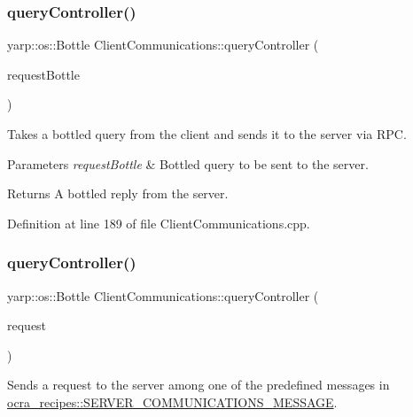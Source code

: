 \subsubsection{\texorpdfstring{query\+Controller()}{queryController()}\hspace{0.1cm}{\footnotesize\ttfamily [1/3]}}
{\footnotesize\ttfamily yarp\+::os\+::\+Bottle Client\+Communications\+::query\+Controller (\begin{DoxyParamCaption}\item[{yarp\+::os\+::\+Bottle \&}]{request\+Bottle }\end{DoxyParamCaption})}

Takes a bottled query from the client and sends it to the server via R\+PC.


\begin{DoxyParams}{Parameters}
{\em request\+Bottle} & Bottled query to be sent to the server.\\
\hline
\end{DoxyParams}
\begin{DoxyReturn}{Returns}
A bottled reply from the server. 
\end{DoxyReturn}


Definition at line 189 of file Client\+Communications.\+cpp.

\hypertarget{classocra__recipes_1_1ClientCommunications_acd90f49ce7b275b83a73a75b9b355109}{}\label{classocra__recipes_1_1ClientCommunications_acd90f49ce7b275b83a73a75b9b355109} 
\subsubsection{\texorpdfstring{query\+Controller()}{queryController()}\hspace{0.1cm}{\footnotesize\ttfamily [2/3]}}
{\footnotesize\ttfamily yarp\+::os\+::\+Bottle Client\+Communications\+::query\+Controller (\begin{DoxyParamCaption}\item[{const \hyperlink{namespaceocra__recipes_ae6246916f1927f7a201cc153ad76b07d}{S\+E\+R\+V\+E\+R\+\_\+\+C\+O\+M\+M\+U\+N\+I\+C\+A\+T\+I\+O\+N\+S\+\_\+\+M\+E\+S\+S\+A\+GE}}]{request }\end{DoxyParamCaption})}

Sends a request to the server among one of the predefined messages in \hyperlink{namespaceocra__recipes_ae6246916f1927f7a201cc153ad76b07d}{ocra\+\_\+recipes\+::\+S\+E\+R\+V\+E\+R\+\_\+\+C\+O\+M\+M\+U\+N\+I\+C\+A\+T\+I\+O\+N\+S\+\_\+\+M\+E\+S\+S\+A\+GE}.


